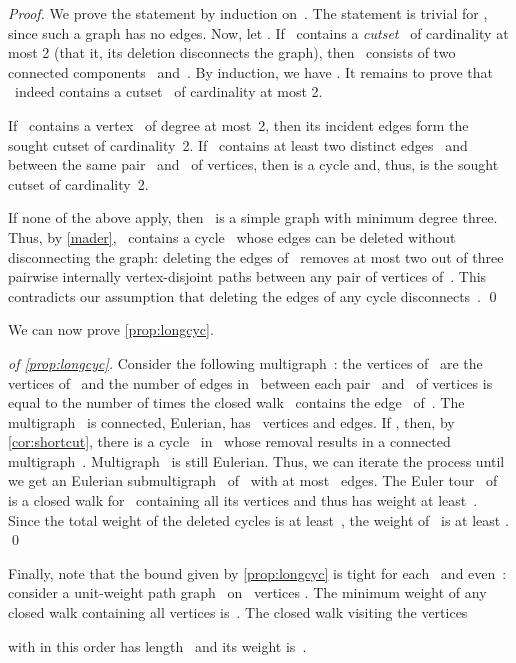 \documentclass[natbib,sort,smallextended,envcountsame,envcountsect,numbook]{svjour3}
\begin{document}
\begin{proof}
  We prove the statement by induction on~.
  The statement is trivial for ,
  since such a graph has no edges.
  Now, let .
  If ~contains a \emph{cutset}~
  of cardinality at most 2
  (that it, its deletion disconnects the graph), then
  ~consists of
  two connected components~ and~.
  By induction, we have 
  .
  It remains to prove that ~indeed contains
  a cutset~ of cardinality at most 2.

  If ~contains a vertex~ of degree at most~2,
  then its incident edges form the sought cutset of cardinality~2.
  If ~contains at least two distinct edges~ and~
  between the same pair~ and~ of vertices,
  then 
  is a cycle and, thus,  is the sought cutset of cardinality~2.
  
  If none of the above apply,
  then ~is a simple graph with minimum degree three.
  Thus, by \cref{mader},
  ~contains a cycle~ whose edges can be deleted
  without disconnecting the graph:
  deleting the edges of~ removes
  at most two out of three pairwise internally vertex-disjoint paths
  between any pair of vertices of~.
  This contradicts our assumption that deleting the edges of any cycle disconnects~.
  \qed
\end{proof}

\noindent We can now prove \cref{prop:longcyc}.
 
\begin{proof}[of \cref{prop:longcyc}]
  Consider the following multigraph~:
  the vertices of~ are the vertices of~
  and
  the number of edges in~ between
  each pair~ and~ of vertices
  is equal to the number of times
  the closed walk~ contains the edge~ of~.
  The multigraph~ is connected, Eulerian, has ~vertices
  and  edges.
  If , then, by \cref{cor:shortcut},
  there is a cycle~ in~ whose removal results
  in a connected multigraph~.
  Multigraph~ is still Eulerian.
  Thus,
  we can iterate the process until
  we get an Eulerian submultigraph~ of~ with at most ~edges.
  The Euler tour~ of~
  is a closed walk for~ containing all its vertices
  and thus
  has weight at least~.
  Since the total weight of the deleted cycles is at least~,
  the weight of~ is at least .
 \qed
\end{proof}
Finally, note that the bound given by \cref{prop:longcyc}
is tight for each~ and even~:
consider a unit-weight path graph~ on ~vertices .
The minimum weight of any closed walk containing all vertices is~.
The closed walk visiting the vertices

with  in this order
has length~ and its weight is~.
\end{document}
